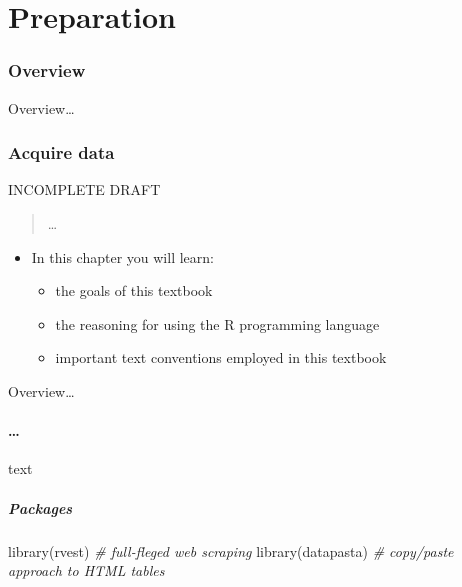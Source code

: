 \documentclass[
]{article}
\newenvironment{Shaded}{\begin{snugshade}}{\end{snugshade}}
\newcommand{\CommentTok}[1]{\textcolor[rgb]{0.56,0.35,0.01}{\textit{#1}}}
\newcommand{\FunctionTok}[1]{\textcolor[rgb]{0.00,0.00,0.00}{#1}}
\newcommand{\NormalTok}[1]{#1}
\providecommand{\tightlist}{%
  \setlength{\itemsep}{0pt}\setlength{\parskip}{0pt}}
\newenvironment{rmdblock}[1]
  {\begin{shaded*}
  \begin{itemize}
  \renewcommand{\labelitemi}{
    \raisebox{-.5\height}[0pt][0pt]{
      {\setkeys{Gin}{width=2em,keepaspectratio}\texttt{[image: assets/images/\#1]}}
    }
  }
  \item
  }
  {
  \end{itemize}
  \end{shaded*}
  }
\newenvironment{rmdkey}
  {\begin{rmdblock}{key}}
  {\end{rmdblock}}
\begin{document}
\hypertarget{part-preparation}{%
\part{Preparation}\label{part-preparation}}

\hypertarget{preparation-overview}{%
\section*{Overview}\label{preparation-overview}}

Overview\ldots{}

\hypertarget{acquire-data}{%
\section{Acquire data}\label{acquire-data}}

INCOMPLETE DRAFT

\begin{quote}
\ldots{}
\end{quote}

\begin{rmdkey}
In this chapter you will learn:

\begin{itemize}
\tightlist
\item
  the goals of this textbook
\item
  the reasoning for using the R programming language
\item
  important text conventions employed in this textbook
\end{itemize}
\end{rmdkey}

Overview\ldots{}

\hypertarget{section}{%
\subsection{\ldots{}}\label{section}}

text

\hypertarget{acquire-data-packages}{%
\subsubsection{Packages}\label{acquire-data-packages}}

\begin{Shaded}
\begin{Highlighting}[]
\FunctionTok{library}\NormalTok{(rvest)  }\CommentTok{\# full{-}fleged web scraping}
\FunctionTok{library}\NormalTok{(datapasta)  }\CommentTok{\# copy/paste approach to HTML tables}
\end{Highlighting}
\end{Shaded}
\end{document}
